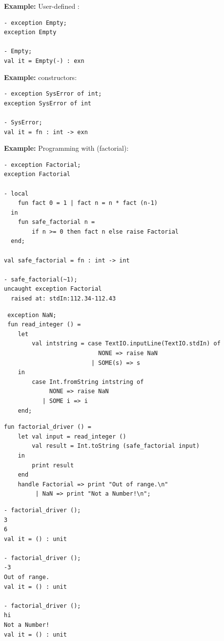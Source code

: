 \textbf{Example: }User-defined :
\begin{verbatim}
- exception Empty;
exception Empty

- Empty;
val it = Empty(-) : exn
\end{verbatim}

\textbf{Example: }  constructors:
\begin{verbatim}
- exception SysError of int;
exception SysError of int

- SysError;
val it = fn : int -> exn
\end{verbatim}

\textbf{Example: }Programming with  (factorial):
\begin{verbatim}
- exception Factorial;
exception Factorial

- local
    fun fact 0 = 1 | fact n = n * fact (n-1)
  in  
    fun safe_factorial n =
        if n >= 0 then fact n else raise Factorial
  end;

val safe_factorial = fn : int -> int

- safe_factorial(~1);
uncaught exception Factorial
  raised at: stdIn:112.34-112.43
\end{verbatim}


\begin{verbatim}
 exception NaN;
 fun read_integer () =
    let
        val intstring = case TextIO.inputLine(TextIO.stdIn) of
                           NONE => raise NaN
                         | SOME(s) => s
    in
        case Int.fromString intstring of
             NONE => raise NaN
           | SOME i => i
    end;   
\end{verbatim}
\begin{verbatim}
fun factorial_driver () =
    let val input = read_integer ()
        val result = Int.toString (safe_factorial input)
    in
        print result
    end
    handle Factorial => print "Out of range.\n"
         | NaN => print "Not a Number!\n";
\end{verbatim}

\begin{verbatim}
- factorial_driver ();
3
6
val it = () : unit

- factorial_driver ();
-3
Out of range.
val it = () : unit

- factorial_driver ();
hi
Not a Number!
val it = () : unit
\end{verbatim}
